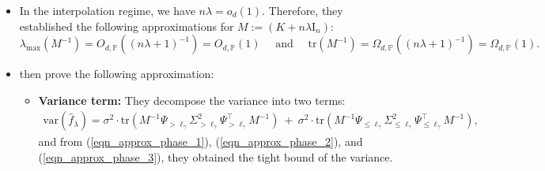 \documentclass{article}
\theoremstyle{plain}
\theoremstyle{definition}
\theoremstyle{remark}
\begin{document}
\begin{appendix}
\begin{itemize}
    \item In the interpolation regime, we have $n\lambda =o_d(1)$. Therefore, they established the following approximations for $M:= (K+n\lambda \mathrm{I}_n)$:
\begin{equation}\label{eqn_approx_phase_3}
\lambda_{\text{max}}\left( M^{-1}\right) = O_{d, \mathbb{P}}((n\lambda+1)^{-1}) = O_{d, \mathbb{P}}(1) \quad \text{ and } \quad
\mathrm{tr}\left( M^{-1}\right)=\Omega_{d, \mathbb{P}}((n\lambda+1)^{-1}) = \Omega_{d, \mathbb{P}}(1).
\end{equation}

\item \cite{zhang2024phase} then prove the following approximation:
\begin{itemize}
    \item {\bf Variance term: } They decompose the variance into two terms:
    \begin{equation}
\label{eq var tr}
    \begin{aligned}
        \mathrm{var}\left( \hat{f}_{\lambda} \right) 
    =  
    \sigma^{2} \cdot \mathrm{tr} \left( M^{-1} \Psi_{>\ell_{\gamma}} \Sigma_{>\ell_{\gamma}}^2 \Psi_{>\ell_{\gamma}}^{\top} M^{-1}\right)  ~+~ \sigma^{2} \cdot \mathrm{tr} \left( M^{-1} \Psi_{\leq \ell_{\gamma}} \Sigma_{\leq \ell_{\gamma}}^{2} \Psi_{\leq \ell_{\gamma}}^{\top} M^{-1}\right),
    \end{aligned}
\end{equation}
and from (\ref{eqn_approx_phase_1}), (\ref{eqn_approx_phase_2}), and (\ref{eqn_approx_phase_3}), they obtained the tight bound of the variance.



\end{itemize}
\end{itemize}
\end{appendix}
\end{document}

